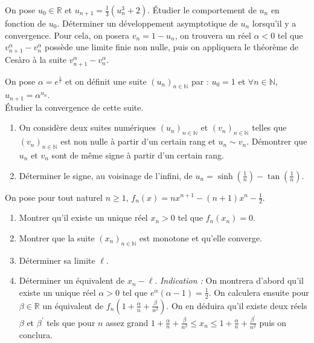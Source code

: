 \begin{exercice}
On pose $u_{0}\in\mathbb{R}$ et $u_{n+1}=\frac{1}{3}(u_{n}^{3}+2)$.
Étudier le comportement de $u_{n}$ en fonction de $u_{0}$.
Déterminer un développement asymptotique de $u_{n}$ lorsqu'il y a convergence.
Pour cela, on posera $v_{n}=1-u_{n}$, on trouvera un réel $\alpha<0$ tel que $v_{n+1}^{\alpha}-v_{n}^{\alpha}$ possède une limite finie non nulle, puis on appliquera le théorème de Cesàro à la suite $v_{n+1}^{\alpha}-v_{n}^{\alpha}$.
\end{exercice}

\begin{exercice}
On pose $\alpha=e^{\frac{1}{e}}$ et on définit une suite $(u_{n})_{n\in\mathbb{N}}$ par :
$u_{0}=1$ et $\forall n\in\mathbb{N}$, $u_{n+1}=\alpha^{u_{n}}$. \\

Étudier la convergence de cette suite.
\end{exercice}

\begin{exercice}
\begin{enumerate}
    \item On considère deux suites numériques $(u_{n})_{n\in\mathbb{N}}$ et $(v_{n})_{n\in\mathbb{N}}$ telles que $(v_{n})_{n\in\mathbb{N}}$ est non nulle à partir d'un certain rang et $u_{n}\sim v_{n}$.
    Démontrer que $u_{n}$ et $v_{n}$ sont de même signe à partir d'un certain rang.

    \item Déterminer le signe, au voisinage de l'infini, de $u_{n}=\sinh(\frac{1}{n})-\tan(\frac{1}{n})$.
\end{enumerate}
\end{exercice}

\begin{exercice}
On pose pour tout naturel $n\ge1$, $f_{n}(x)=nx^{n+1}-(n+1)x^{n}-\frac{1}{2}$.
\begin{enumerate}
    \item Montrer qu'il existe un unique réel $x_{n}>0$ tel que $f_{n}(x_{n})=0$.
    \item Montrer que la suite $(x_{n})_{n\in\mathbb{N}}$ est monotone et qu'elle converge.
    \item Déterminer sa limite $\ell$.
    \item Déterminer un équivalent de $x_{n}-\ell$.
    \textit{Indication :} On montrera d'abord qu'il existe un unique réel $\alpha>0$ tel que $e^{\alpha}(\alpha-1)=\frac{1}{2}$. On calculera ensuite pour $\beta\in\mathbb{R}$ un équivalent de $f_{n}(1+\frac{\alpha}{n}+\frac{\beta}{n^{2}})$. On en déduira qu'il existe deux réels $\beta$ et $\beta^{\prime}$ tels que pour $n$ assez grand $1+\frac{\alpha}{n}+\frac{\beta}{n^{2}}\le x_{n}\le1+\frac{\alpha}{n}+\frac{\beta^{\prime}}{n^{2}}$ puis on conclura.
\end{enumerate}
\end{exercice}

